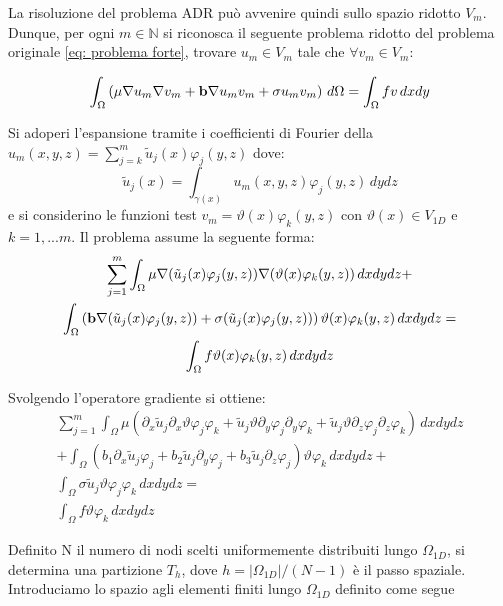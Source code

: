 La risoluzione del problema ADR pu\`o avvenire quindi sullo spazio ridotto $V_m$.
Dunque, per ogni $m\in\mathbb{N}$ si riconosca il seguente problema ridotto del problema originale \eqref{eq: problema forte}, 
trovare $u_m\in V_m$ tale che $\forall v_m\in V_m$:

\begin{multline}
\int_\Omega\left(\mu\nabla u_m\nabla v_m + \mathbf{b}\nabla u_mv_m+\sigma u_mv_m\right)\,d\Omega
=\int_\Omega fv \,dxdy
\end{multline}

Si adoperi l'espansione tramite i coefficienti di Fourier della $u_m(x,y,z)=\sum_{j=k}^m\tilde{u}_j(x)\varphi _j(y,z)$ dove:
\begin{displaymath}
\tilde{u}_j(x)=\int_{\gamma(x)}u_m(x,y,z) \varphi_j(y,z)\,dydz
\end{displaymath}
e si considerino le funzioni test $v_m=\vartheta(x)\varphi _k(y,z)$ con $\vartheta(x)\in V_{1D}$ e $k=1,...m$. Il problema assume la seguente forma:
\begin{multline}
\sum_{j=1}^m
\int_\Omega\mu\nabla (\tilde{u}_j(x)\varphi _j(y,z))\nabla (\vartheta(x)\varphi _k(y,z))\,dxdydz+\\
\int_\Omega\left(\mathbf{b}\nabla (\tilde{u}_j(x)\varphi _j(y,z))+\sigma (\tilde{u}_j(x)\varphi _j(y,z))\right)\vartheta(x)\varphi _k(y,z)\,dxdydz =\\
\int_\Omega f\vartheta(x)\varphi _k(y,z)\,dxdydz\\
\end{multline}

Svolgendo l'operatore gradiente si ottiene:
\begin{multline}
\sum_{j=1}^m
\int_\Omega\mu( \partial_x\tilde{u}_j \partial_x\vartheta\varphi _j\varphi _k + \tilde{u}_j \vartheta \partial_y\varphi _j\partial_y\varphi _k + \tilde{u}_j \vartheta \partial_z\varphi _j\partial_z\varphi _k)\,dxdydz \\
+ \int_\Omega (b_1\partial_x\tilde{u}_j\varphi _j+b_2\tilde{u}_j\partial_y\varphi _j + b_3\tilde{u}_j\partial_z\varphi_j)\vartheta\varphi _k\,dxdydz + \\ 
\int_\Omega \sigma\tilde{u}_j\vartheta\varphi _j\varphi _k\,dxdydz =\\
\int_\Omega f\vartheta\varphi _k\,dxdydz
\end{multline}


Definito N il numero di nodi scelti uniformemente distribuiti lungo $\Omega_{1D}$, si determina una partizione $T_h$, dove $h=\vert \Omega_{1D}\vert / (N-1)$ \`e il passo spaziale. Introduciamo lo spazio agli elementi finiti lungo $\Omega_{1D}$ definito come segue

